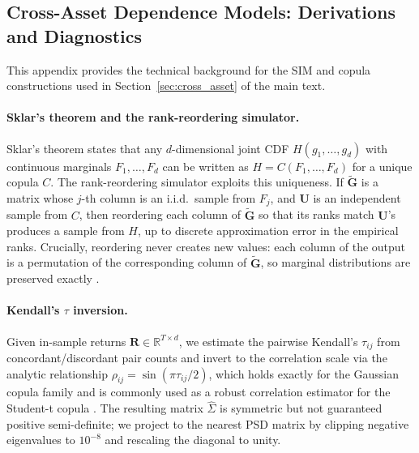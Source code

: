 \subsection{Cross-Asset Dependence Models: Derivations and Diagnostics}
\label{sec:cross_asset_supp}

This appendix provides the technical background for the SIM and copula constructions used in Section~\ref{sec:cross_asset} of the main text.

\paragraph{Sklar's theorem and the rank-reordering simulator.}
Sklar's theorem \cite{sklar1959fonctions, nelsen2006introduction} states that any $d$-dimensional joint CDF $H(g_1, \dots, g_d)$ with continuous marginals $F_1, \dots, F_d$ can be written as $H = C(F_1, \dots, F_d)$ for a unique copula $C$.
The rank-reordering simulator exploits this uniqueness.
If $\tilde{\mathbf{G}}$ is a matrix whose $j$-th column is an i.i.d.\ sample from $F_j$, and $\mathbf{U}$ is an independent sample from $C$, then reordering each column of $\tilde{\mathbf{G}}$ so that its ranks match $\mathbf{U}$'s produces a sample from $H$, up to discrete approximation error in the empirical ranks.
Crucially, reordering never creates new values: each column of the output is a permutation of the corresponding column of $\tilde{\mathbf{G}}$, so marginal distributions are preserved exactly \cite{iman1982distribution}.

\paragraph{Kendall's $\tau$ inversion.}
Given in-sample returns $\mathbf{R} \in \mathbb{R}^{T \times d}$, we estimate the pairwise Kendall's $\tau_{ij}$ from concordant/discordant pair counts and invert to the correlation scale via the analytic relationship $\rho_{ij} = \sin(\pi \tau_{ij} / 2)$, which holds exactly for the Gaussian copula family and is commonly used as a robust correlation estimator for the Student-t copula \cite{embrechts2002correlation, mcneil2015quantitative}.
The resulting matrix $\hat{\Sigma}$ is symmetric but not guaranteed positive semi-definite; we project to the nearest PSD matrix by clipping negative eigenvalues to $10^{-8}$ and rescaling the diagonal to unity.

